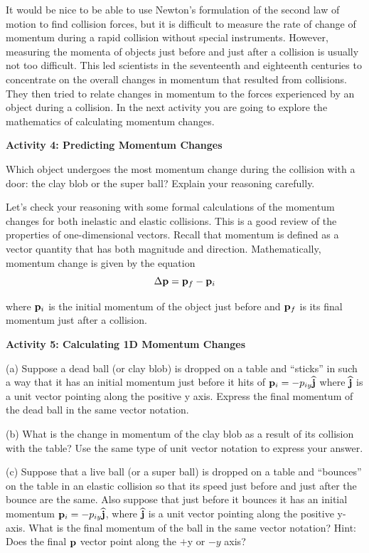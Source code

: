 It would be nice to be able to use Newton's formulation of the second law of
motion to find collision forces, but it is difficult to measure the rate of
change of momentum during a rapid collision without special instruments. However,
measuring the momenta of objects just before and just after a collision is usually
not too difficult. This led scientists in the seventeenth and eighteenth centuries
to concentrate on the overall changes in momentum that resulted from collisions.
They then tried to relate changes in momentum to the forces experienced by an
object during a collision. In the next activity you are going to explore the
mathematics of calculating momentum changes.

\textbf{Activity 4: Predicting Momentum Changes }

Which object undergoes the most momentum change during the collision with a
door: the clay blob or the super ball? Explain your reasoning carefully.
\vspace{20mm}

Let's check your reasoning with some formal calculations of the momentum changes
for both inelastic and elastic collisions. This is a good review of the properties
of one-dimensional vectors. Recall that momentum is defined as a vector quantity
that has both magnitude and direction. Mathematically, momentum change is given
by the equation
\[
\Delta {\bf p}={{\bf p}_{f}}-{{\bf p}_{i}}\]


where \( {{\bf p}_{i}} \) is the initial momentum of the object just
before and \( {{\bf p}_{f}} \) is its final momentum just after a
collision.

\textbf{Activity 5: Calculating 1D Momentum Changes} 

(a) Suppose a dead ball (or clay blob) is dropped on a table and ``sticks''
in such a way that it has an initial momentum just before it hits of 
\( {{\bf p}_{i}}=-p_{iy}\widehat{\bf j} \)
where \( \widehat{\bf j} \) is a unit vector pointing along the positive y axis.
Express the final momentum of the dead ball in the same vector notation.
\vspace{10mm}

(b) What is the change in momentum of the clay blob as a result of its collision
with the table? Use the same type of unit vector notation to express your answer.
\vspace{10mm}

(c) Suppose that a live ball (or a super ball) is dropped on a table and ``bounces''
on the table in an elastic collision so that its speed just before and just
after the bounce are the same. Also suppose that just before it bounces it has
an initial momentum \( {{\bf p}_{i}}=-p_{iy}\widehat{\bf j} \),
where \( \widehat{\bf j} \)
is a unit vector pointing along the positive y-axis. What is the final momentum
of the ball in the same vector notation? Hint: Does the final 
\( {\bf p} \)
vector point along the $+$y or $-y$ axis? 
\vspace{10mm}

